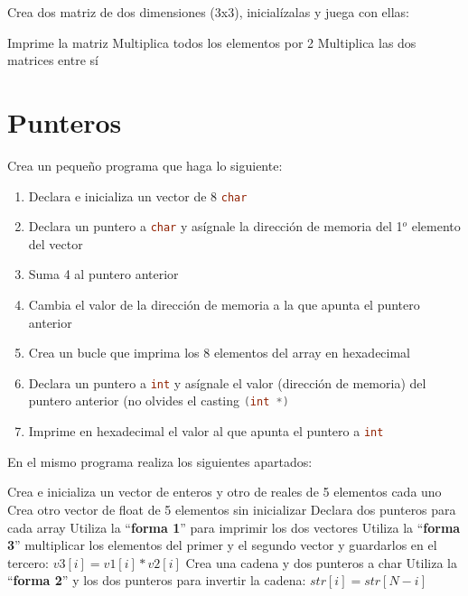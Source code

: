 \documentclass{tareas}
\begin{document}
\begin{problem}[Matrices]
\begin{statement}
	Crea dos matriz de dos dimensiones (3x3), inicialízalas y juega con
	ellas:

	\begin{subproblems}
		\subp Imprime la matriz
		\subp Multiplica todos los elementos por 2
		\subp Multiplica las dos matrices entre sí
	\end{subproblems}
\end{statement}
\end{problem}


\clearpage
\section{Punteros}
\begin{problem}[Sintáxis]
\begin{statement}
	Crea un pequeño programa que haga lo siguiente:
	\begin{enumerate}
		\item Declara e inicializa un vector de 8 \lstinline[language=C]|char|
		\item Declara un puntero a \lstinline[language=C]|char| y
			asígnale la dirección de memoria del 1$^o$ elemento del
			vector
		\item Suma 4 al puntero anterior
		\item Cambia el valor de la dirección de memoria a la que apunta
			el puntero anterior
		\item Crea un bucle que imprima los 8 elementos del array en
			hexadecimal
		\item Declara un puntero a \lstinline[language=C]|int| y
			asígnale el valor (dirección de memoria) del puntero
			anterior (no olvides el casting
			\lstinline[language=C]|(int *)|
		\item Imprime en hexadecimal el valor al que apunta el puntero a
			\lstinline[language=C]|int|
	\end{enumerate}
	\vspace{-2em}
\end{statement}
\end{problem}

\begin{problem}
\begin{statement}
	En el mismo programa realiza los siguientes apartados:
	\begin{subproblems}
		\subp Crea e inicializa un vector de enteros y otro de reales de
		5 elementos cada uno
		\subp Crea otro vector de float de 5 elementos sin inicializar
		\subp Declara dos punteros para cada array
		\subp Utiliza la ``\textbf{forma 1}'' para imprimir los dos
		vectores
		\subp Utiliza la ``\textbf{forma 3}'' multiplicar los elementos
		del primer y el segundo vector y guardarlos en el tercero:
		$v3[i] = v1[i] * v2[i]$
		\subp Crea una cadena y dos punteros a char
		\subp Utiliza la ``\textbf{forma 2}'' y los dos punteros para
		invertir la cadena: $str[i] = str[N-i]$
	\end{subproblems}
\end{statement}
\end{problem}
\end{document}
